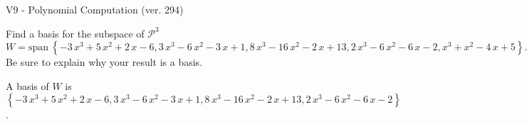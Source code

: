 \begin{exercise}
  \begin{exerciseTitle}V9 - Polynomial Computation (ver. 294)\end{exerciseTitle}
  \begin{exerciseStatement}
    Find a basis for the subspace of \(\mathcal{P}^3\) 
\[W=\mathrm{span}\ \left\{-3 \, x^{3} + 5 \, x^{2} + 2 \, x - 6 , 3 \, x^{3} - 6 \, x^{2} - 3 \, x + 1 , 8 \, x^{3} - 16 \, x^{2} - 2 \, x + 13 , 2 \, x^{3} - 6 \, x^{2} - 6 \, x - 2 , x^{3} + x^{2} - 4 \, x + 5\right\}.\]
 Be sure to explain why your result is a basis.


  \end{exerciseStatement}
  \begin{exerciseAnswer}
   A basis of \(W\) is  \(\left\{-3 \, x^{3} + 5 \, x^{2} + 2 \, x - 6 , 3 \, x^{3} - 6 \, x^{2} - 3 \, x + 1 , 8 \, x^{3} - 16 \, x^{2} - 2 \, x + 13 , 2 \, x^{3} - 6 \, x^{2} - 6 \, x - 2\right\}\).
  


  \end{exerciseAnswer}
\end{exercise}